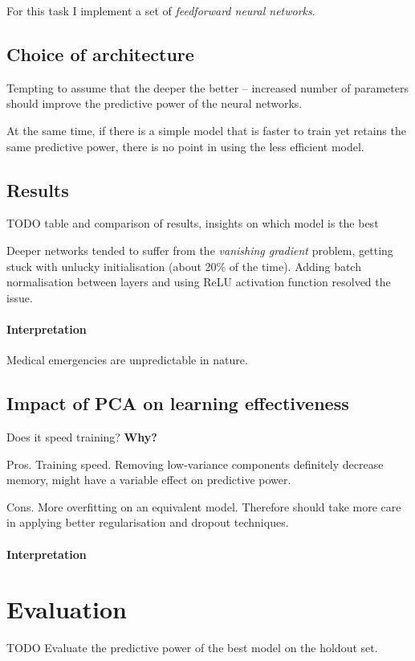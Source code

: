 \documentclass[10pt, twocolumn]{article}
\begin{document}
For this task I implement a set of \textit{feedforward neural networks}.

\subsection{Choice of architecture}
Tempting to assume that the deeper the better – increased number of parameters should improve the predictive power of the neural networks.

At the same time, if there is a simple model that is faster to train yet retains the same predictive power, there is no point in using the less efficient model.




\subsection{Results}
TODO table and comparison of results, insights on which model is the best

Deeper networks tended to suffer from the \textit{vanishing gradient} problem, getting stuck with unlucky initialisation (about 20\% of the time). Adding batch normalisation between layers and using ReLU activation function resolved the issue.


\paragraph{Interpretation}
Medical emergencies are unpredictable in nature. 


\subsection{Impact of PCA on learning effectiveness}

Does it speed training? \textbf{Why?}

Pros. Training speed. Removing low-variance components definitely decrease memory, might have a variable effect on predictive power.

Cons. More overfitting on an equivalent model. Therefore should take more care in applying better regularisation and dropout techniques. 
\paragraph{Interpretation}

\section{Evaluation}
TODO Evaluate the predictive power of the best model on the holdout set.


\medskip
 


\end{document}

